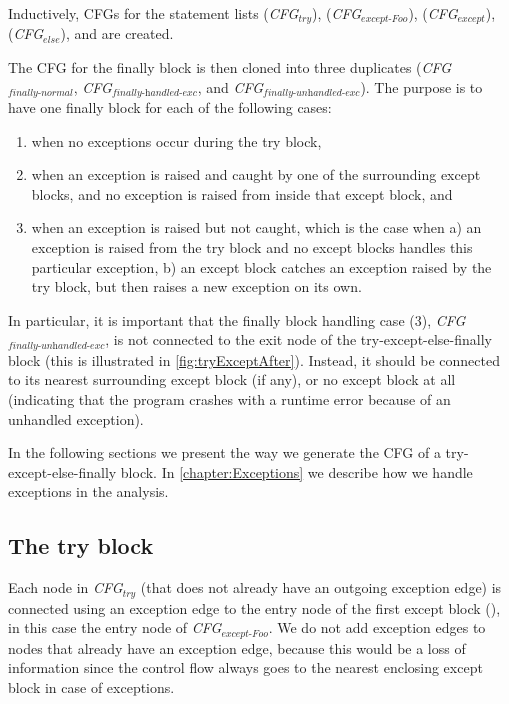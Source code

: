 \begin{sloppypar}
  Inductively, CFGs for the statement lists  (\textit{CFG$_{\textit{try}}$}), 
   (\textit{CFG$_{\textit{except-Foo}}$}),  (\textit{CFG$_{\textit{except}}$}), 
   (\textit{CFG$_{\textit{else}}$}), and  are created. 
\end{sloppypar}

The CFG for the finally block is then cloned into three duplicates (\textit{CFG$_{\textit{finally-normal}}$}, 
\textit{CFG$_{\textit{finally-handled-exc}}$}, and \textit{CFG$_{\textit{finally-unhandled-exc}}$}). The purpose is to have one finally block for each of the following cases: 

\begin{enumerate}
  \item when no exceptions occur during the try block,
  \item when an exception is raised and caught by one of the surrounding except blocks, and no exception is raised from inside that except block, and
  \item when an exception is raised but not caught, which is the case when 
    a) an exception is raised from the try block and no except blocks handles this particular exception, 
    b) an except block catches an exception raised by the try block, but then raises a new exception on its own.
\end{enumerate}

In particular, it is important that the finally block handling case (3), \textit{CFG$_{\textit{finally-unhandled-exc}}$}, 
is not connected to the exit node of the try-except-else-finally block (this is illustrated in \autoref{fig:tryExceptAfter}). Instead, it should be connected to its nearest surrounding except block (if any), or no except block at all (indicating that the program crashes with a runtime error because of an unhandled exception).

In the following sections we present the way we generate the CFG of a try-except-else-finally block. In \autoref{chapter:Exceptions} we describe how we handle exceptions in the analysis.


\subsection{The try block}
Each node in \textit{CFG$_{\textit{try}}$} (that does not already have an outgoing exception edge) is connected using an exception edge to the entry node of the first except block (\inlinecode{*}), in this case the entry node of \textit{CFG$_{\textit{except-Foo}}$}. We do not add exception edges to nodes that already have an exception edge, because this would be a loss of information since the control flow always goes to the nearest enclosing except block in case of exceptions.

